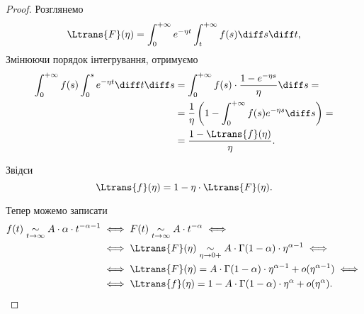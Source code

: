 \begin{proof}
        
        

    Розглянемо
    \begin{equation}
        \Ltrans{F}(\eta) = \int_0^{+\infty} e^{-\eta t} \int_t^{+\infty} f(s) \diff s \diff t,
    \end{equation}
    Змінюючи порядок інтегрування, отримуємо
    \begin{equation}
        \begin{aligned}
            \int_0^{+\infty} f(s) \int_0^s e^{-\eta t} \diff t \diff s
            &= \int_0^{+\infty} f(s) \cdot \frac{1 - e^{-\eta s}}{\eta} \diff s = \\
            &= \frac{1}{\eta} \left( 1 - \int_0^{+\infty} f(s) e^{-\eta s} \diff s \right) = \\
            &= \frac{1 - \Ltrans{f}(\eta)}{\eta}.
        \end{aligned}
    \end{equation}

    Звідси
    \begin{equation}
        \Ltrans{f}(\eta) = 1 - \eta \cdot \Ltrans{F}(\eta).
    \end{equation}

    Тепер можемо записати
    \begin{equation}
        \begin{aligned}
            f(t) \underset{t \to \infty}{\sim} A \cdot \alpha \cdot t^{-\alpha - 1}
            &\iff F(t) \underset{t \to \infty}{\sim} A \cdot t^{-\alpha} \iff \\
            &\iff \Ltrans{F}(\eta) \underset{\eta \to 0+}{\sim} A \cdot \Gamma(1 - \alpha) \cdot \eta^{\alpha - 1} \iff \\
            &\iff \Ltrans{F}(\eta) = A \cdot \Gamma(1 - \alpha) \cdot \eta^{\alpha - 1} + o(\eta^{\alpha - 1}) \iff \\
            &\iff \Ltrans{f}(\eta) = 1 - A \cdot \Gamma(1 - \alpha) \cdot \eta^{\alpha} + o(\eta^{\alpha}).
        \end{aligned}
    \end{equation}
\end{proof}
